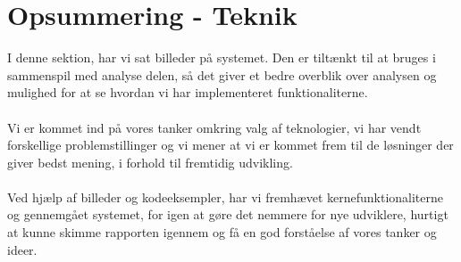 \section{Opsummering - Teknik}
I denne sektion, har vi sat billeder på systemet. Den er tiltænkt til at bruges i sammenspil med analyse delen, så det  giver et bedre overblik over analysen og mulighed for at se
hvordan vi har implementeret funktionaliterne.
\\\\
Vi er kommet ind på vores tanker omkring valg af teknologier, vi har vendt forskellige problemstillinger og vi mener at vi er kommet frem til de løsninger der giver bedst mening, i forhold til fremtidig udvikling.
\\\\
Ved hjælp af billeder og kodeeksempler, har vi fremhævet kernefunktionaliterne og gennemgået systemet, for igen at gøre det nemmere for nye udviklere, hurtigt at kunne skimme rapporten igennem og få en god forståelse af vores tanker og ideer.
